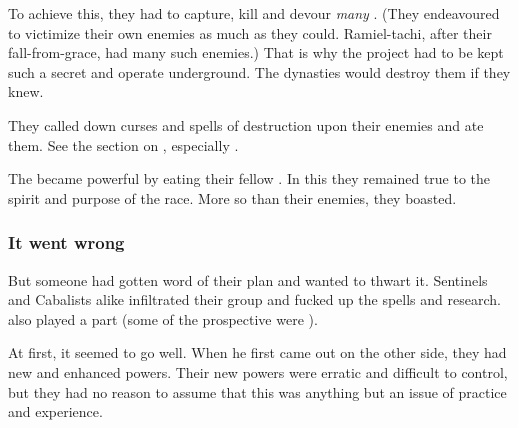 To achieve this, they had to capture, kill and devour \emph{many} \resphain{}.
(They endeavoured to victimize their own enemies as much as they could.
Ramiel-tachi, after their fall-from-grace, had many such enemies.)
That is why the project had to be kept such a secret and operate underground.  
The dynasties would destroy them if they knew. 

They called down curses and spells of destruction upon their enemies and ate them.
See the section on , especially .

The \malachim became powerful by eating their fellow \resphain.
In this they remained true to the spirit and purpose of the \resphan race. 
More so than their enemies, they boasted.




\subsubsection{It went wrong}
But someone had gotten word of their plan and wanted to thwart it. 
Sentinels and Cabalists alike infiltrated their group and fucked up the spells and research. 
 also played a part (some of the prospective \malachim{} were \satharioth). 

At first, it seemed to go well. 
When he first \malachim{} came out on the other side, they had new and enhanced powers. 
Their new powers were erratic and difficult to control, but they had no reason to assume that this was anything but an issue of practice and experience. 

